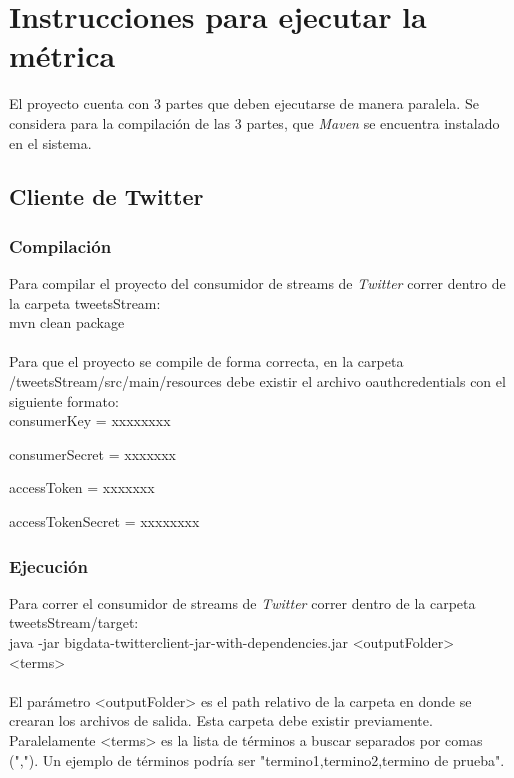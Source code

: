 \documentclass[a4paper,10pt]{article}
\begin{document}
\section{Instrucciones para ejecutar la métrica}

El proyecto cuenta con 3 partes que deben ejecutarse de manera paralela.
Se considera para la compilación de las 3 partes, que \textit{Maven} se encuentra instalado en el sistema.

\subsection{Cliente de Twitter}

\subsubsection{Compilación}

Para compilar el proyecto del consumidor de streams de \textit{Twitter} correr dentro de la carpeta tweetsStream:
\\

    mvn clean package
\\
\\
Para que el proyecto se compile de forma correcta, en la carpeta /tweetsStream/src/main/resources debe existir el archivo oauthcredentials con el siguiente formato:
\\

consumerKey = xxxxxxxx

consumerSecret = xxxxxxx

accessToken = xxxxxxx

accessTokenSecret = xxxxxxxx

\subsubsection{Ejecución}

Para correr el consumidor de streams de \textit{Twitter} correr dentro de la carpeta tweetsStream/target:
\\

	java -jar bigdata-twitterclient-jar-with-dependencies.jar <outputFolder> <terms>
\\
\\
El parámetro <outputFolder> es el path relativo de la carpeta en donde se crearan los archivos de salida. Esta carpeta debe existir previamente.
Paralelamente <terms> es la lista de términos a buscar separados por comas (","). Un ejemplo de términos podría ser "termino1,termino2,termino de prueba".
\end{document}

